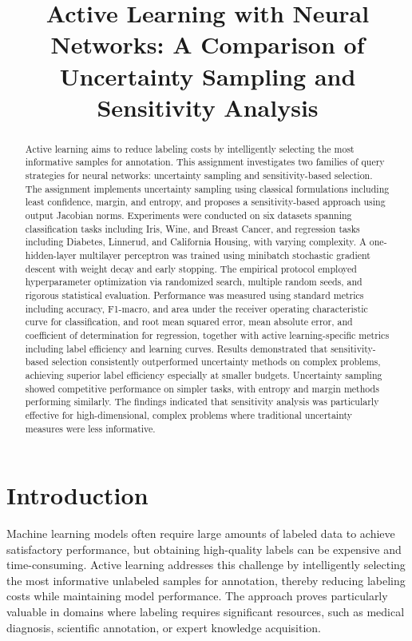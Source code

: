 \documentclass[conference]{IEEEtran}
\title{Active Learning with Neural Networks: A Comparison of Uncertainty Sampling and Sensitivity Analysis}
\author{\IEEEauthorblockN{\nameinit\ \surname\ \, (\studentnumber)}
\IEEEauthorblockA{Stellenbosch University\\ Machine Learning 441\\ \emailaddr}}
\begin{document}
\maketitle

\begin{abstract}
Active learning aims to reduce labeling costs by intelligently selecting the most informative samples for annotation. This assignment investigates two families of query strategies for neural networks: uncertainty sampling and sensitivity-based selection. The assignment implements uncertainty sampling using classical formulations including least confidence, margin, and entropy, and proposes a sensitivity-based approach using output Jacobian norms. Experiments were conducted on six datasets spanning classification tasks including Iris, Wine, and Breast Cancer, and regression tasks including Diabetes, Linnerud, and California Housing, with varying complexity. A one-hidden-layer multilayer perceptron was trained using minibatch stochastic gradient descent with weight decay and early stopping. The empirical protocol employed hyperparameter optimization via randomized search, multiple random seeds, and rigorous statistical evaluation. Performance was measured using standard metrics including accuracy, F1-macro, and area under the receiver operating characteristic curve for classification, and root mean squared error, mean absolute error, and coefficient of determination for regression, together with active learning-specific metrics including label efficiency and learning curves. Results demonstrated that sensitivity-based selection consistently outperformed uncertainty methods on complex problems, achieving superior label efficiency especially at smaller budgets. Uncertainty sampling showed competitive performance on simpler tasks, with entropy and margin methods performing similarly. The findings indicated that sensitivity analysis was particularly effective for high-dimensional, complex problems where traditional uncertainty measures were less informative.
\end{abstract}

\section{Introduction}

Machine learning models often require large amounts of labeled data to achieve satisfactory performance, but obtaining high-quality labels can be expensive and time-consuming. Active learning addresses this challenge by intelligently selecting the most informative unlabeled samples for annotation, thereby reducing labeling costs while maintaining model performance. The approach proves particularly valuable in domains where labeling requires significant resources, such as medical diagnosis, scientific annotation, or expert knowledge acquisition.
\end{document}

